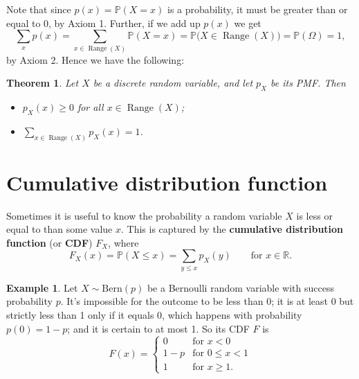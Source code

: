 \documentclass[
  a4paper,
]{book}
\providecommand{\tightlist}{%
  \setlength{\itemsep}{0pt}\setlength{\parskip}{0pt}}
\newtheorem{theorem}{Theorem}[chapter]
\theoremstyle{definition}
\theoremstyle{definition}
\newtheorem{example}{Example}[chapter]
\theoremstyle{definition}
\theoremstyle{definition}
\theoremstyle{remark}
\begin{document}
Note that since \(p(x) = \mathbb P(X = x)\) is a probability, it must be greater than or equal to 0, by Axiom 1. Further, if we add up \(p(x)\) we get
\[ \sum_{x} p(x) =  \sum_{x \in \operatorname{Range}(X)} \mathbb P(X = x) = \mathbb P\big(X \in \operatorname{Range}(X)\big)  =  \mathbb P(\Omega) = 1,  \]
by Axiom 2.
Hence we have the following:

\begin{theorem}

Let \(X\) be a discrete random variable, and let \(p_X\) be its PMF. Then

\begin{itemize}
\tightlist
\item
  \(p_X(x) \geq 0\) for all \(x \in \operatorname{Range}(X)\);
\item
  \({\displaystyle \sum_{x \in \operatorname{Range}(X)} p_X(x) = 1}\).
\end{itemize}

\end{theorem}

\hypertarget{cdf}{%
\section{Cumulative distribution function}\label{cdf}}

Sometimes it is useful to know the probability a random variable \(X\) is less or equal to than some value \(x\). This is captured by the \textbf{cumulative distribution function} (or \textbf{CDF}) \(F_X\), where
\[ F_X(x) = \mathbb P(X \leq x) = \sum_{y \leq x} p_X(y) \qquad \text{for $x \in \mathbb R$.}  \]

\begin{example}
Let \(X \sim \text{Bern}(p)\) be a Bernoulli random variable with success probability \(p\). It's impossible for the outcome to be less than 0; it is at least 0 but strictly less than 1 only if it equals 0, which happens with probability \(p(0) = 1-p\); and it is certain to at most 1. So its CDF \(F\) is
\[ F(x) = \begin{cases} 0 & \text{for $x < 0$} \\
                      1-p & \text{for $0 \leq x < 1$} \\
                      1   & \text{for $x \geq 1$} . \end{cases} \]
\end{example}
\end{document}
